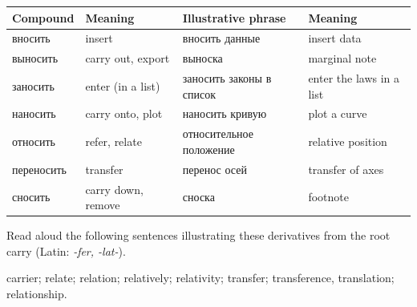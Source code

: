 \begingroup
\small
\setlength{\tabcolsep}{3pt}
\renewcommand{\arraystretch}{1.08}
\begin{longtable}{@{}>{\cyrillicfont}p{27mm}p{28mm}>{\cyrillicfont}p{45mm}p{40mm}@{}}
\toprule
\normalfont Compound & Meaning & \normalfont Illustrative phrase & Meaning\\
\midrule
\endhead
вносить & insert & вносить данные & insert data\\
выносить & carry out, export & выноска & marginal note\\
заносить & enter (in a list) & заносить законы в список & enter the laws in a list\\
наносить & carry onto, plot & наносить кривую & plot a curve\\
относить & refer, relate & относительное положение & relative position\\
переносить & transfer & перенос осей & transfer of axes\\
сносить & carry down, remove & сноска & footnote\\
\bottomrule
\end{longtable}
\endgroup

\begin{keybox}[Exercise 5.2]
Read aloud the following sentences illustrating these derivatives from the root  carry (Latin: \emph{-fer, -lat-}).
\end{keybox}

\noindent{} carrier;  relate;  relation;  relatively;  relativity;  transfer;  transference, translation;  relationship.

